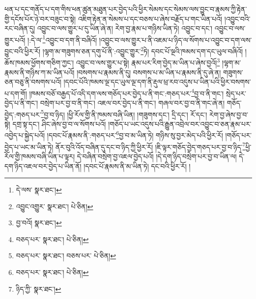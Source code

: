 ཕན་པ་དང་གནོད་པ་དག་གིས་ཕན་ཚུན་མཐུན་པར་བྱེད་པའི་ཕྱིར་སེམས་དང་སེམས་ལས་བྱུང་བ་རྣམས་ཀྱི་རྟེན་གྱི་དངོས་པོར་ཉེ་བར་བཟུང་བ་སྟེ། འཇིག་རྟེན་ན་སེམས་པ་དང་བཅས་པ་ཞེས་བརྗོད་པ་གང་ཡིན་པའོ། །འབྱུང་བའི་རང་བཞིན་དུ། འབྱུང་བ་ལས་གྱུར་པ་དུ་ཡིན་ཞེ་ན། རེག་བྱ་རྣམ་པ་གཉིས་ཡིན་ཏེ། འབྱུང་བ་དང་། འབྱུང་བ་ལས་གྱུར་པའོ། །:དེ་ལ་\footnote{དེ་ལས་  སྣར་ཐང་། }འབྱུང་བ་དག་ནི་བཞིའོ། །འབྱུང་བ་ལས་གྱུར་པ་ནི་འཇམ་པ་ཉིད་ལ་སོགས་པ་འབྱུང་བ་དག་ལས་བྱུང་བའི་ཕྱིར་རོ། །ལྷག་མ་གཟུགས་ཅན་དགུ་པོ་ནི་:འབྱུང་གྱུར་\footnote{འབྱུང་འགྱུར་  སྣར་ཐང་།  པེ་ཅིན། }ཏེ། དབང་པོ་ལྔའི་ཁམས་དག་དང་ཡུལ་བཞིའོ། །ཆོས་ཁམས་ཕྱོགས་གཅིག་ཀྱང་། འབྱུང་བ་ལས་གྱུར་པ་སྟེ། རྣམ་པར་རིག་བྱེད་མ་ཡིན་པ་ཞེས་བྱའོ།\footnote{བྱ་བའོ།  སྣར་ཐང་། } །ལྷག་མ་རྣམས་ནི་གཉིས་ཀ་མ་ཡིན་པའོ། །བསགས་པ་རྣམས་ནི་དུ། བསགས་པ་མ་ཡིན་པ་རྣམས་ནི་དུ་ཞེ་ན། གཟུགས་ཅན་བཅུ་ནི་བསགས་པའོ། །དབང་པོའི་ཁམས་ལྔ་དང་ཡུལ་ལྔ་དག་ནི་རྡུལ་ཕྲ་རབ་འདུས་པ་ཡིན་པའི་ཕྱིར་བསགས་པ་དག་གོ། །ཁམས་བཅོ་བརྒྱད་པོ་འདི་དག་ལས་གཅོད་པར་བྱེད་པ་ནི་གང་:གཅད་པར་\footnote{བཅད་པར་  སྣར་ཐང་།  པེ་ཅིན། }བྱ་བ་ནི་གང་། སྲེད་པར་བྱེད་པ་ནི་གང་། བསྲེག་པར་བྱ་བ་ནི་གང་། འཇལ་བར་བྱེད་པ་ནི་གང་། གཞལ་བར་བྱ་བ་ནི་གང་ཞེ་ན། གཅོད་བྱེད་:གཅད་པར་\footnote{བཅད་པར་  སྣར་ཐང་། བཅས་པར་  པེ་ཅིན། }བྱ་བ་ཉིད། །ཕྱི་རོལ་གྱི་ནི་ཁམས་བཞི་ཡིན། །གཟུགས་དང་། དྲི་དང་། རོ་དང་། རེག་བྱ་ཞེས་བྱ་བ་སྟེ། དགྲ་སྟ་དང་། ཤིང་ཞེས་བྱ་བ་ལ་སོགས་པའོ། །གཅོད་པ་ཡང་འདུས་པའི་རྒྱུན་འབྲེལ་བར་འབྱུང་བ་ཅན་རྣམ་པར་འབྱེད་པ་སྐྱེད་པའོ། །དབང་པོ་རྣམས་ནི་:གཅད་པར་\footnote{བཅད་པར་  སྣར་ཐང་།  པེ་ཅིན། }བྱ་བ་མ་ཡིན་ཏེ། གཉིས་སུ་བྱར་མེད་པའི་ཕྱིར་རོ། །གཅོད་པར་བྱེད་པ་ཡང་མ་ཡིན་ཏེ། ནོར་བུའི་འོད་བཞིན་དུ་དང་བ་ཉིད་ཀྱི་ཕྱིར་རོ། །ཇི་ལྟར་གཅོད་བྱེད་གཅད་པར་བྱ་བ་ཉིད་\footnote{ཉིད་ཀྱི་  སྣར་ཐང་། }ཕྱི་རོལ་གྱི་ཁམས་བཞི་ཡིན་པ་ལྟར། དེ་བཞིན་བསྲེག་བྱ་འཇལ་བྱེད་པའོ། །དེ་དག་ཉིད་བསྲེག་པར་བྱ་བ་ཡིན་ལ། དེ་དག་ཉིད་འཇལ་བར་བྱེད་པ་ཡིན་ནོ། །དབང་པོ་རྣམས་ནི་མ་ཡིན་ཏེ། དང་བའི་ཕྱིར་རོ། །
